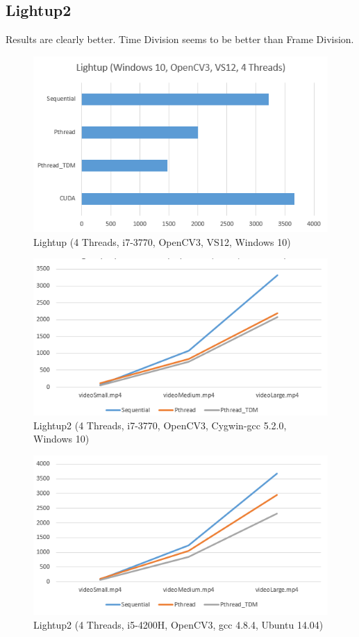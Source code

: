 \documentclass{acm_proc_article-sp}
\begin{document}
\subsection{Lightup2}
Results are clearly better. Time Division seems to be better than Frame Division.
\begin{figure}[H]
  \includegraphics[width=\linewidth,natwidth=529,natheight=316]{lightup2.png}
  \caption{Lightup (4 Threads, i7-3770, OpenCV3, VS12, Windows 10)}
  \label{fig:lightup2}
\end{figure}
\begin{figure}[H]
  \includegraphics[width=\linewidth,natwidth=535,natheight=285]{lightup2_sml.png}
  \caption{Lightup2 (4 Threads, i7-3770, OpenCV3, Cygwin-gcc 5.2.0, Windows 10)}
  \label{fig:lightup2_sml}
\end{figure}
\begin{figure}[H]
  \includegraphics[width=\linewidth,natwidth=536,natheight=290]{lightup2_ubuntu.png}
  \caption{Lightup2 (4 Threads, i5-4200H, OpenCV3, gcc 4.8.4, Ubuntu 14.04)}
  \label{fig:lightup2_ubuntu}
\end{figure}
\end{document}
